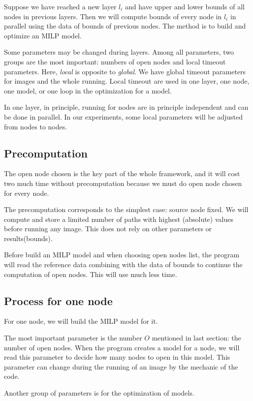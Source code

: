 \documentclass{llncs}
\begin{document}
Suppose we have reached a new layer $l_i$ and have upper and lower bounds of all nodes in previous layers. Then we will compute bounds of every node in $l_i$ in parallel using the data of bounds of previous nodes. The method is to build and optimize an MILP model.

Some parameters may be changed during layers. Among all parameters, two groups are the most important: numbers of open nodes and local timeout parameters. Here, \emph{local} is opposite to \emph{global}. We have global timeout parameters for images and the whole running. Local timeout are used in one layer, one node, one model, or one loop in the optimization for a model.

In one layer, in principle, running for nodes are in principle independent and can be done in parallel. In our experiments, some local parameters will be adjusted from nodes to nodes.

\subsection{Precomputation}

The open node chosen is the key part of the whole framework, and it will cost two much time without precomputation because we must do open node chosen for every node. 

The precomputation corresponds to the simplest case: source node fixed. We will compute and store a limited number of paths with highest (absolute) values before running any image. This does not rely on other parameters or results(bounds).

Before build an MILP model and when choosing open nodes list,  the program will read the reference data combining with the data of bounds to continue the computation of open nodes. This will use much less time.


\subsection{Process for one node}

For one node, we will build the MILP model for it.

The most important parameter is the number $O$ mentioned in last section:  the number of open nodes. When the program creates a model for a node, we will read this parameter to decide how many nodes to open in this model. This parameter can change during the running of an image by the mechanic of the code.


Another group of parameters is for the optimization of models. 
\end{document}
